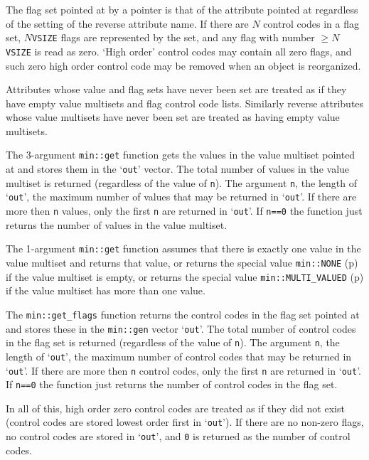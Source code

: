 \documentclass[12pt]{article}
\newcommand{\pagref}[1]{p\pageref{#1}}
\newcommand{\EOL}{\penalty \exhyphenpenalty}
\begin{document}
The flag set pointed at by a pointer is that of the attribute pointed
at regardless of the setting of the reverse attribute name.
If there are $N$ control codes in a flag set, $N${\tt *VSIZE} flags are
represented by the set, and any flag with number $\geq N${\tt *VSIZE} is
read as zero.  `High order' control codes may contain all zero flags,
and such zero high order control code may be removed when an object
is reorganized.

Attributes whose value and flag sets have never been set are treated
as if they have empty value multisets and flag control code lists.
Similarly reverse attributes
whose value multisets have never been set are treated as having empty value
multisets.

The 3-argument {\tt min::\EOL get} function gets the values in the value
multiset pointed at and stores them in the `{\tt out}' vector.
The total number of values in the value
multiset is returned (regardless of the value of {\tt n}).
The argument {\tt n}, the length of `{\tt out}',
the maximum number of values that may be returned in `{\tt out}'.
If there are more then {\tt n} values, only the first {\tt n}
are returned in `{\tt out}'.
If {\tt n==0} the function just returns
the number of values in the value multiset.

The 1-argument {\tt min::\EOL get} function assumes that there is exactly
one value in the value multiset
and returns that value, or returns the special value
\verb|min::NONE| (\pagref{MIN::NONE}) if the value multiset is empty,
or returns the special value
\verb|min::MULTI_VALUED| (\pagref{MIN::MULTI_VALUED}) if the value multiset
has more than one value.

The {\tt min::\EOL get\_\EOL flags}
function returns the control codes in the flag set pointed at and stores
these in the \verb|min::gen| vector `{\tt out}'.
The total number of control codes in the flag set is returned
(regardless of the value of {\tt n}).
The argument {\tt n}, the length of `{\tt out}',
the maximum number of control codes that may be returned in `{\tt out}'.
If there are more then {\tt n} control codes, only the first {\tt n}
are returned in `{\tt out}'.
If {\tt n==0} the function just returns
the number of control codes in the flag set.

In all of this, high order zero control codes are treated as if
they did not exist (control codes are stored lowest order first
in `{\tt out}').  If there are no non-zero flags, no control codes
are stored in `{\tt out}', and {\tt 0} is returned as the number of
control codes.
\end{document}
